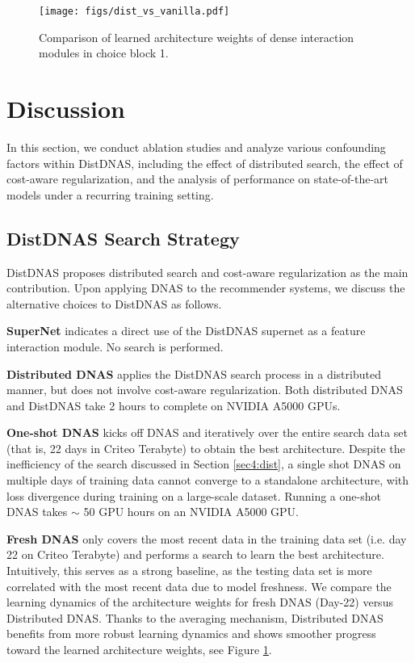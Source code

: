 \begin{figure}[t]
    \begin{center}
    \texttt{[image: figs/dist\_vs\_vanilla.pdf]}
    \vspace{-1em}
    \caption{Comparison of learned architecture weights of dense interaction modules in choice block 1.}
    \vspace{-2em}
    \label{fig:dist_vs_vanilla}    
    \end{center}
\end{figure}

\section{Discussion}
In this section, we conduct ablation studies and analyze various confounding factors within DistDNAS, including the effect of distributed search, the effect of cost-aware regularization, and the analysis of performance on state-of-the-art models under a recurring training setting.

\subsection{DistDNAS Search Strategy}
DistDNAS proposes distributed search and cost-aware regularization as the main contribution. Upon applying DNAS to the recommender systems, we discuss the alternative choices to DistDNAS as follows.

\noindent \textbf{SuperNet} indicates a direct use of the DistDNAS supernet as a feature interaction module. No search is performed.

\noindent \textbf{Distributed DNAS} applies the DistDNAS search process in a distributed manner, but does not involve cost-aware regularization. Both distributed DNAS and DistDNAS take 2 hours to complete on NVIDIA A5000 GPUs.

\noindent \textbf{One-shot DNAS} kicks off DNAS and iteratively over the entire search data set (that is, 22 days in Criteo Terabyte) to obtain the best architecture. Despite the inefficiency of the search discussed in Section \ref{sec4:dist}, a single shot DNAS on multiple days of training data cannot converge to a standalone architecture, with loss divergence during training on a large-scale dataset. Running a one-shot DNAS takes $\sim$ 50 GPU hours on an NVIDIA A5000 GPU.

\noindent \textbf{Fresh DNAS} only covers the most recent data in the training data set (i.e. day 22 on Criteo Terabyte) and performs a search to learn the best architecture. Intuitively, this serves as a strong baseline, as the testing data set is more correlated with the most recent data due to model freshness.
We compare the learning dynamics of the architecture weights for fresh DNAS (Day-22) versus Distributed DNAS.
Thanks to the averaging mechanism, Distributed DNAS benefits from more robust learning dynamics and shows smoother progress toward the learned architecture weights, see Figure \ref{fig:dist_vs_vanilla}. 

